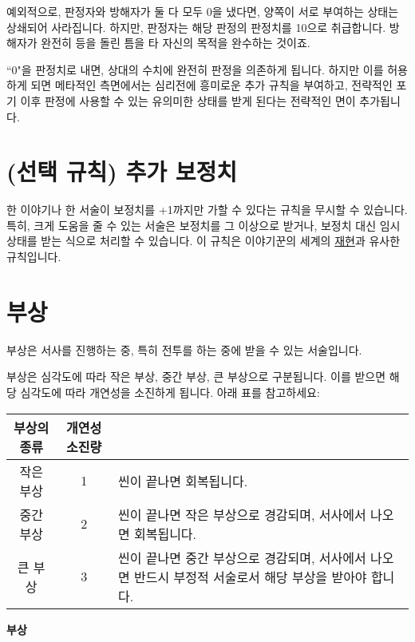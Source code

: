 \documentclass{report}
\begin{document}
	예외적으로, 판정자와 방해자가 둘 다 모두 0을 냈다면, 양쪽이 서로 부여하는 상태는 상쇄되어 사라집니다. 하지만, 판정자는 해당 판정의 판정치를 10으로 취급합니다. 방해자가 완전히 등을 돌린 틈을 타 자신의 목적을 완수하는 것이죠.
	
	``0"을 판정치로 내면, 상대의 수치에 완전히 판정을 의존하게 됩니다. 하지만 이를 허용하게 되면 메타적인 측면에서는 심리전에 흥미로운 추가 규칙을 부여하고, 전략적인 포기 이후 판정에 사용할 수 있는 유의미한 상태를 받게 된다는 전략적인 면이 추가됩니다.
	
	\section*{(선택 규칙) 추가 보정치}
	한 이야기나 한 서술이 보정치를 +1까지만 가할 수 있다는 규칙을 무시할 수 있습니다. 특히, 크게 도움을 줄 수 있는 서술은 보정치를 그 이상으로 받거나, 보정치 대신 임시 상태를 받는 식으로 처리할 수 있습니다. 이 규칙은 이야기꾼의 세계의 \hyperlink{emersion}{재현}과 유사한 규칙입니다.
	
	\section*{부상}
	부상은 서사를 진행하는 중, 특히 전투를 하는 중에 받을 수 있는 서술입니다.
	
	부상은 심각도에 따라 작은 부상, 중간 부상, 큰 부상으로 구분됩니다. 이를 받으면 해당 심각도에 따라 개연성을 소진하게 됩니다. 아래 표를 참고하세요:
	
	\begin{minipage}{\textwidth}
		\begin{tabularx}{\textwidth}{c!{\color{black}\vrule}c!{\color{black}\vrule}X}
			\hline
			\textbf{부상의 종류} & \textbf{개연성 소진량} &  \\ \hline \hline
			작은 부상 & 1 & 씬이 끝나면 회복됩니다. \\ \hline
			중간 부상 & 2 & 씬이 끝나면 작은 부상으로 경감되며, 서사에서 나오면 회복됩니다. \\ \hline
			큰 부상 & 3 & 씬이 끝나면 중간 부상으로 경감되며, 서사에서 나오면 반드시 부정적 서술로서 해당 부상을 받아야 합니다. \\ \hline
		\end{tabularx}
		
		\smallskip
		
		\begin{tightcenter}
			\textbf{부상}
		\end{tightcenter}
	\end{minipage}
	
\end{document}
